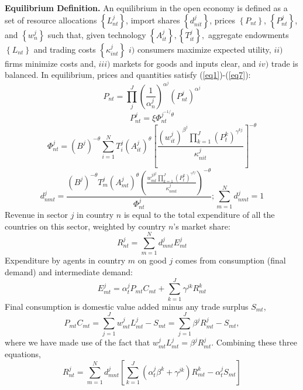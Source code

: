 \documentclass[12pt]{article}
\begin{document}
\textbf{Equilibrium Definition. } An equilibrium in the open economy is
defined as a set of resource allocations $\left\{ L_{nt}^{j}\right\} $,
import shares $\left\{ d_{nit}^{j}\right\} $, prices $\left\{ P_{nt}\right\} 
$, $\left\{ P_{nt}^{j}\right\} $, and $\left\{ w_{n}^{j}\right\} $ such
that, given technology $\left\{ A_{it}^{j}\right\}
,\left\{T_{it}^{j}\right\} ,$ aggregate endowments $\left\{ L_{nt}\right\} $
and trading costs $\left\{ \kappa _{int}^{j}\right\} $ $i)$ consumers
maximize expected utility, $ii)$ firms minimize costs and, $iii)$ markets
for goods and inputs clear, and $iv)$ trade is balanced. In equilibrium,
prices and quantities satisfy (\ref{eq1})-(\ref{eq7}): 
\begin{equation}
P_{nt}=\prod_{j}^{J}\left( \frac{1}{\alpha _{n}^{j}}\right)
^{\alpha^{j}}\left( P_{nt}^{j}\right) ^{\alpha ^{j}}  \label{eq1}
\end{equation}
\begin{equation}
P_{nt}^{j}=\xi\Phi _{nt}^{j^{-1/}\theta }  \label{eq2}
\end{equation}
\begin{equation}
\Phi _{nt}^{j}=
	\left( B^{j}\right)^{-\theta}
	\sum_{i=1}^{N}
		T_{i}^{j}\left(A_{it}^{j}\right)^{\theta }
		\left[ 
			\frac
				{\left(w_{it}^{j}\right) ^{\beta ^{j}}	\prod_{k=1}^J (P_{t}^k)^{\gamma^{kj}}}
				{\kappa _{nit}^{j}}
		\right]^{-\theta }  \label{eq3}
\end{equation}
\begin{equation}
d_{nmt}^{j}=
	\frac
		{\left( B^{j}\right)^{-\theta}T_{m}^{j}\left(A_{mt}^{j}\right) ^{\theta }
		\left( 
			\frac
				{w_{mt}^{j\beta^{j}}\prod_{k=1}^J (P_{t}^k)^{\gamma^{kj}}}
				{\kappa _{nmt}^{j}}\right) ^{-\theta }}
		{\Phi_{nt}^{j}};
\sum\limits_{m=1}^{N}d_{nmt}^{j}=1  \label{eq4}
\end{equation}
Revenue in sector $j$ in country $n$ is equal to the total expenditure of all the countries on this sector, weighted by country $n$'s market share:
\[
R^j_{nt} =
	\sum_{m=1}^N
		d^j_{mnt}
		E^j_{mt}
\]
Expenditure by agents in country $m$ on good $j$ comes from consumption (final demand) and intermediate demand:
\[
E^j_{mt} =
	\alpha^j_t P_{mt}C_{mt}
	+ \sum_{k=1}^J \gamma^{jk}R^k_{mt}
\]
Final consumption is domestic value added minus any trade surplus $S_{mt}$,
\[
P_{mt}C_{mt} = \sum_{j=1}^J w_{mt}^jL_{mt}^j - S_{mt}
 = \sum_{j=1}^J \beta^j R_{mt}^j - S_{mt},
\]
where we have made use of the fact that $w^j_{mt}L^j_{mt} = \beta^j R^j_{mt}$. Combining these three equations,
\begin{equation}\label{eq5}
	R_{nt}^j =
		\sum_{m=1}^N 
			d_{mnt}^j
			\left[
				\sum_{k=1}^J (\alpha^j_t\beta^k + \gamma^{jk}) R_{mt}^k 
				- \alpha^j_t S_{mt}
			\right]
\end{equation}
\end{document}
